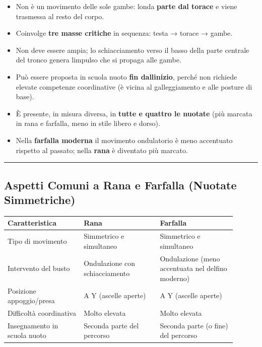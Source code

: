 \documentclass[a4paper,11pt]{article}
\providecommand{\tightlist}{%
  \setlength{\itemsep}{0pt}\setlength{\parskip}{0pt}}
\begin{document}
\begin{itemize}
      \tightlist
      \item
            Non è un movimento delle sole gambe: l\textquotesingle onda
            \textbf{parte dal torace} e viene trasmessa al resto del corpo.
      \item
            Coinvolge \textbf{tre masse critiche} in sequenza: testa → torace →
            gambe.
      \item
            Non deve essere ampia; lo schiacciamento verso il basso della parte
            centrale del tronco genera l\textquotesingle impulso che si propaga
            alle gambe.
      \item
            Può essere proposta in scuola nuoto \textbf{fin
                  dall\textquotesingle inizio}, perché non richiede elevate competenze
            coordinative (è vicina al galleggiamento e alle posture di base).
      \item
            È presente, in misura diversa, in \textbf{tutte e quattro le nuotate}
            (più marcata in rana e farfalla, meno in stile libero e dorso).
      \item
            Nella \textbf{farfalla moderna} il movimento ondulatorio è meno
            accentuato rispetto al passato; nella \textbf{rana} è diventato più
            marcato.
\end{itemize}

\begin{center}\rule{0.5\linewidth}{0.5pt}\end{center}

\subsection{Aspetti Comuni a Rana e Farfalla (Nuotate
      Simmetriche)}\label{aspetti-comuni-a-rana-e-farfalla-nuotate-simmetriche}

\begin{longtable}[]{@{}p{0.30\linewidth}p{0.30\linewidth}p{0.30\linewidth}@{}}
      \toprule\noalign{}
      Caratteristica               & Rana                           & Farfalla                \\
      \midrule\noalign{}
      \endhead
      \bottomrule\noalign{}
      \endlastfoot
      Tipo di movimento            & Simmetrico e simultaneo        & Simmetrico e simultaneo \\
      Intervento del busto         & Ondulazione con schiacciamento & Ondulazione
      (meno accentuata nel delfino moderno)                                                   \\
      Posizione appoggio/presa     & A Y (ascelle aperte)           & A Y (ascelle
      aperte)                                                                                 \\
      Difficoltà coordinativa      & Molto elevata                  & Molto elevata           \\
      Insegnamento in scuola nuoto & Seconda parte del percorso     & Seconda
      parte (o fine) del percorso                                                             \\
\end{longtable}
\end{document}
